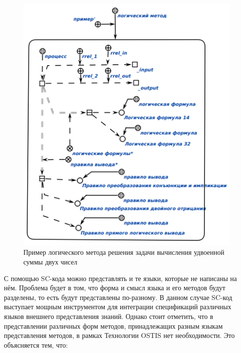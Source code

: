 \begin{figure}[htbp]
  \center
  \includegraphics[scale=0.6]{author/part3/figures/logic_program.png}
  \caption{Пример логического метода решения задачи вычисления удвоенной суммы двух чисел}
  \label{fig:logic_program}
\end{figure}

С помощью SC-кода можно представлять и те языки, которые не написаны на нём. Проблема будет в том, что форма и смысл языка и его методов будут разделены, то есть будут представлены по-разному. В данном случае SC-код выступает мощным инструментом для интеграции спецификаций различных языков внешнего представления знаний. Однако стоит отметить, что в представлении различных форм методов, принадлежащих разным языкам представления методов, в рамках Технологии OSTIS нет необходимости. Это объясняется тем, что:

